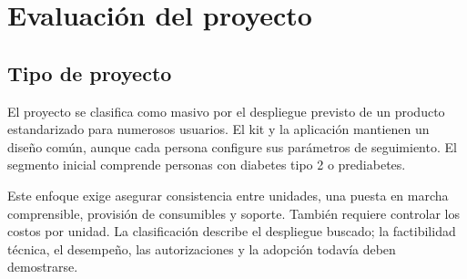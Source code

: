 \section{Evaluación del proyecto}





\subsection{Tipo de proyecto}





El proyecto se clasifica como masivo por el despliegue previsto de un producto estandarizado para numerosos usuarios. El kit y la aplicación mantienen un diseño común, aunque cada persona configure sus parámetros de seguimiento. El segmento inicial comprende personas con diabetes tipo 2 o prediabetes.

Este enfoque exige asegurar consistencia entre unidades, una puesta en marcha comprensible, provisión de consumibles y soporte. También requiere controlar los costos por unidad. La clasificación describe el despliegue buscado; la factibilidad técnica, el desempeño, las autorizaciones y la adopción todavía deben demostrarse.


